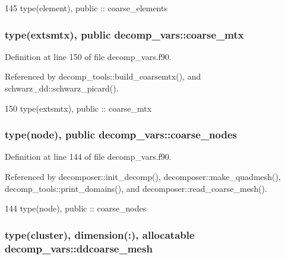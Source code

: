\begin{DoxyCode}
145   \textcolor{keywordtype}{type}(element), \textcolor{keywordtype}{public}  :: coarse_elements
\end{DoxyCode}
\subsubsection[{coarse\+\_\+mtx}]{\setlength{\rightskip}{0pt plus 5cm}type({\bf extsmtx}), public decomp\+\_\+vars\+::coarse\+\_\+mtx}\label{namespacedecomp__vars_aec54e28f08c81a19841a20ea57e09d0b}


Definition at line 150 of file decomp\+\_\+vars.\+f90.



Referenced by decomp\+\_\+tools\+::build\+\_\+coarsemtx(), and schwarz\+\_\+dd\+::schwarz\+\_\+picard().


\begin{DoxyCode}
150   \textcolor{keywordtype}{type}(extsmtx), \textcolor{keywordtype}{public} :: coarse_mtx
\end{DoxyCode}
\subsubsection[{coarse\+\_\+nodes}]{\setlength{\rightskip}{0pt plus 5cm}type({\bf node}), public decomp\+\_\+vars\+::coarse\+\_\+nodes}\label{namespacedecomp__vars_a3d16852eebecdbaeeb609df974770f3d}


Definition at line 144 of file decomp\+\_\+vars.\+f90.



Referenced by decomposer\+::init\+\_\+decomp(), decomposer\+::make\+\_\+quadmesh(), decomp\+\_\+tools\+::print\+\_\+domains(), and decomposer\+::read\+\_\+coarse\+\_\+mesh().


\begin{DoxyCode}
144   \textcolor{keywordtype}{type}(node), \textcolor{keywordtype}{public}     :: coarse_nodes
\end{DoxyCode}
\subsubsection[{ddcoarse\+\_\+mesh}]{\setlength{\rightskip}{0pt plus 5cm}type({\bf cluster}), dimension(\+:), allocatable decomp\+\_\+vars\+::ddcoarse\+\_\+mesh\hspace{0.3cm}{\ttfamily [private]}}\label{namespacedecomp__vars_ab48cc3be4c0f2222d0e396b66af626fb}


